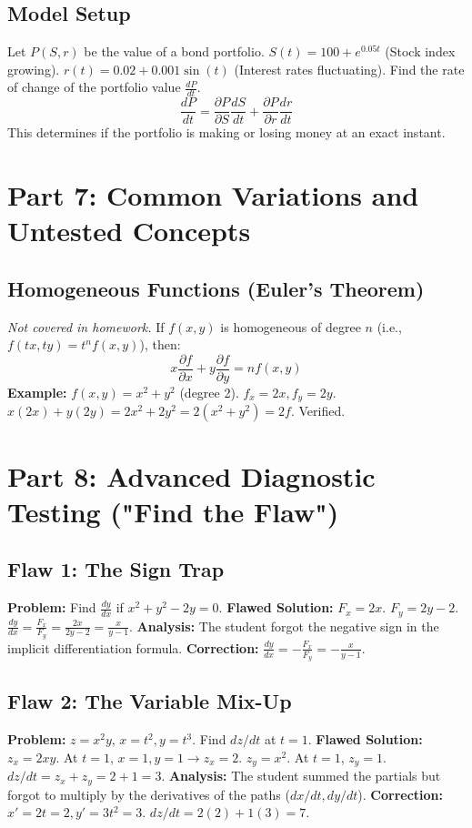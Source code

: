 \documentclass[11pt, letterpaper]{article}
\theoremstyle{definition}
\begin{document}
\subsection{Model Setup}
Let $P(S, r)$ be the value of a bond portfolio.
$S(t) = 100 + e^{0.05t}$ (Stock index growing).
$r(t) = 0.02 + 0.001\sin(t)$ (Interest rates fluctuating).
Find the rate of change of the portfolio value $\frac{dP}{dt}$.
\[ \frac{dP}{dt} = \frac{\partial P}{\partial S}\frac{dS}{dt} + \frac{\partial P}{\partial r}\frac{dr}{dt} \]
This determines if the portfolio is making or losing money at an exact instant.

\section{Part 7: Common Variations and Untested Concepts}

\subsection{Homogeneous Functions (Euler's Theorem)}
\textit{Not covered in homework.}
If $f(x,y)$ is homogeneous of degree $n$ (i.e., $f(tx, ty) = t^n f(x,y)$), then:
\[ x\frac{\partial f}{\partial x} + y\frac{\partial f}{\partial y} = n f(x,y) \]
\textbf{Example:} $f(x,y) = x^2 + y^2$ (degree 2).
$f_x = 2x, f_y = 2y$.
$x(2x) + y(2y) = 2x^2 + 2y^2 = 2(x^2+y^2) = 2f$. Verified.

\section{Part 8: Advanced Diagnostic Testing ("Find the Flaw")}

\subsection*{Flaw 1: The Sign Trap}
\textbf{Problem:} Find $\frac{dy}{dx}$ if $x^2 + y^2 - 2y = 0$.
\textbf{Flawed Solution:}
$F_x = 2x$. $F_y = 2y - 2$.
$\frac{dy}{dx} = \frac{F_x}{F_y} = \frac{2x}{2y-2} = \frac{x}{y-1}$.
\textbf{Analysis:} The student forgot the negative sign in the implicit differentiation formula.
\textbf{Correction:} $\frac{dy}{dx} = -\frac{F_x}{F_y} = -\frac{x}{y-1}$.

\subsection*{Flaw 2: The Variable Mix-Up}
\textbf{Problem:} $z = x^2y$, $x=t^2, y=t^3$. Find $dz/dt$ at $t=1$.
\textbf{Flawed Solution:}
$z_x = 2xy$. At $t=1$, $x=1, y=1 \to z_x = 2$.
$z_y = x^2$. At $t=1$, $z_y = 1$.
$dz/dt = z_x + z_y = 2 + 1 = 3$.
\textbf{Analysis:} The student summed the partials but forgot to multiply by the derivatives of the paths ($dx/dt, dy/dt$).
\textbf{Correction:} $x'=2t=2, y'=3t^2=3$. $dz/dt = 2(2) + 1(3) = 7$.
\end{document}
